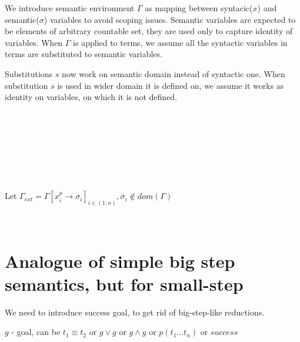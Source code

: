 \documentclass{article}
\begin{document}
We introduce semantic environment $ \Gamma $ as mapping between syntacic($x$) and semantic($\sigma$) variables to avoid scoping issues. Semantic variables are expected to be elements of arbitrary countable set, they are used only to capture identity of variables. When $ \Gamma $ is applied to terms, we assume all the syntactic variables in terms are substituted to semantic variables.

Substitutions $ s $ now work on semantic domain instead of syntactic one. When substitution $ s $ is used in wider domain it is defined on, we assume it works as identity on variables, on which it is not defined.

\ 


\ 


\ 

\ 

Let $ \Gamma_{ext} = \Gamma[x^p_i \rightarrow \sigma_i]_{i \in (1:n)}, \sigma_i \notin dom(\Gamma) $

\ 



\section{Analogue of simple big step semantics, but for small-step}

We need to introduce success goal, to get rid of big-step-like reductions.

$ g $ - goal, can be $ t_1 \equiv t_2 $ or $ g \vee g $ or $ g \wedge g $ or $ p(t_1 ... t_n) $ or $ success $

\ 


\ 


\ 


\end{document}
